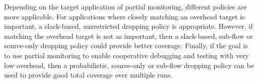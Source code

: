 Depending on the target application of partial monitoring, different policies
are more applicable.
For applications where closely matching an overhead target is important, a
slack-based, unrestricted dropping policy is appropriate. However, if matching
the overhead target is not as important, then a slack-based, sub-flow or source-only dropping
policy could provide better coverage. 
Finally, if the goal is to use partial monitoring to enable cooperative
debugging and testing with very low overhead, then a probabilistic,
source-only or sub-flow dropping policy can be used to provide good total coverage over
multiple runs.

% 
